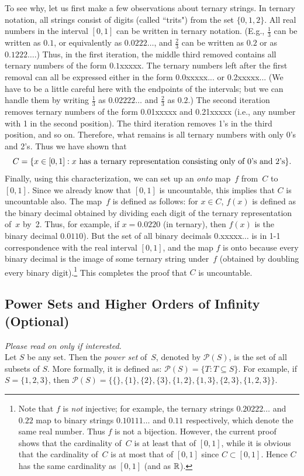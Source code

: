 \documentclass[11pt,fleqn]{article}
\begin{document}
To see why, let us first make a few observations about ternary strings. In ternary
notation, all strings consist of digits (called ``trits") from the set $\{0,1,2\}$. All real numbers
in the interval $[0,1]$ can be written in ternary notation. (E.g., $\frac{1}{3}$ can be written as 
$0.1$, or equivalently as $0.0222\ldots$, and $\frac{2}{3}$ can be written as $0.2$ or
as $0.1222\ldots$.)  Thus, in the first iteration, the middle third removed contains
all ternary numbers of the form $0.1$xxxxx. The ternary numbers left after the first removal 
can all be expressed either in the form 0.0xxxxx... or 0.2xxxxx...
(We have to be a little careful here with the endpoints of the intervals; but we can
handle them by writing $\frac{1}{3}$ as $0.02222\ldots$ and $\frac{2}{3}$ as $0.2$.) 
The second iteration removes ternary numbers of the form 0.01xxxxx and 0.21xxxxx
(i.e., any number with 1 in the second position).
The third iteration removes 1's in the third position, and so on.  
Therefore, what remains is all ternary numbers with only 0's and 2's.  Thus we have
shown that $$
   C = \{x\in[0,1]:\hbox{\rm $x$ has a ternary representation consisting only of 0's and 2's}\}. $$
Finally, using this characterization, we can set up an {\it onto\/} map~$f$ from~$C$ to 
$[0,1]$.  Since we already know that $[0,1]$ is uncountable, this implies that $C$ is
uncountable also.  The map~$f$ is defined as follows: for $x\in C$, $f(x)$ is defined
as the binary decimal obtained by dividing each digit of the ternary representation of~$x$
by~2.  Thus, for example, if $x = 0.0220$ (in ternary), then $f(x)$ 
is the binary decimal $0.0110$).  But the set of all binary decimals 0.xxxxx$\ldots$
is in 1-1 correspondence with the real interval $[0,1]$, and the map $f$ is onto 
because every binary decimal is the image of some ternary string under~$f$ 
(obtained by doubling every binary digit).\footnote{Note that $f$ is {\it not\/}
injective; for example, the ternary strings $0.20222\ldots$ and $0.22$
map to binary strings $0.10111\ldots$ and $0.11$ respectively, which
denote the same real number.  Thus $f$ is not a bijection.  However, the current
proof shows that the cardinality of~$C$ is at least that of $[0,1]$, while it is obvious
that the cardinality of~$C$ is at most that of $[0,1]$ since $C\subset [0,1]$.  Hence
$C$ has the same cardinality as $[0,1]$ (and as $\mathbb{R}$).}    
This completes the proof that $C$ is uncountable.

\subsection*{Power Sets and Higher Orders of Infinity (Optional) }
\textit{Please read on only if interested.}\\
Let $S$ be any set. Then the {\it power set\/} of~$S$, denoted by $\mathcal{P}(S)$, is
the set of all subsets of $S$. More formally, it is defined as: $\mathcal{P}(S) = \{T :
T \subseteq S\}$. For example, if $S = \{1,2,3\}$, then $\mathcal{P}(S) =
\{\{\},\{1\},\{2\},\{3\},\{1,2\},\allowbreak\{1,3\},\allowbreak\{2,3\},\{1,2,3\}\}$. 
\end{document}
